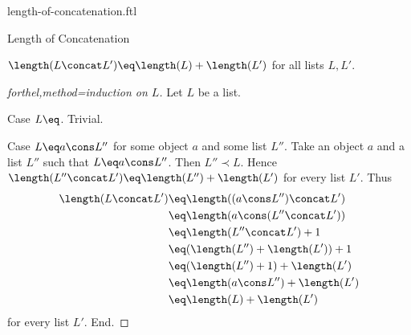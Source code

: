 \documentclass{naproche-library}
\begin{document}
\begin{smodule}{length-of-concatenation.ftl}

  \begin{sfragment}{Length of Concatenation}
    \begin{proposition}[forthel,id=LISTS_LENGTHCONCAT_4512036658964875]
      $\length(L \concat L') \eq \length(L) + \length(L')$ for all lists $L, L'$.
    \end{proposition}
    \begin{proof}[forthel,method=induction on $L$]
      Let $L$ be a list.

      Case $L \eq \list{}$. Trivial.

      Case $L \eq a \cons L''$ for some object $a$ and some list $L''$.
        Take an object $a$ and a list $L''$ such that $L \eq a \cons L''$.
        Then $L'' \prec L$.
        Hence $\length(L'' \concat L') \eq \length(L'') + \length(L')$ for every list $L'$.
        Thus
        \begin{align*}
          \length(L \concat L')
            &\eq \length((a \cons L'') \concat L')\\
            &\eq \length(a \cons (L'' \concat L'))\\
            &\eq \length(L'' \concat L') + 1\\
            &\eq (\length(L'') + \length(L')) + 1\\
            &\eq (\length(L'') + 1) + \length(L')\\
            &\eq \length(a \cons L'') + \length(L')\\
            &\eq \length(L) + \length(L')
        \end{align*}
        for every list $L'$.
      End.
    \end{proof}
  \end{sfragment}
\end{smodule}
\end{document}
